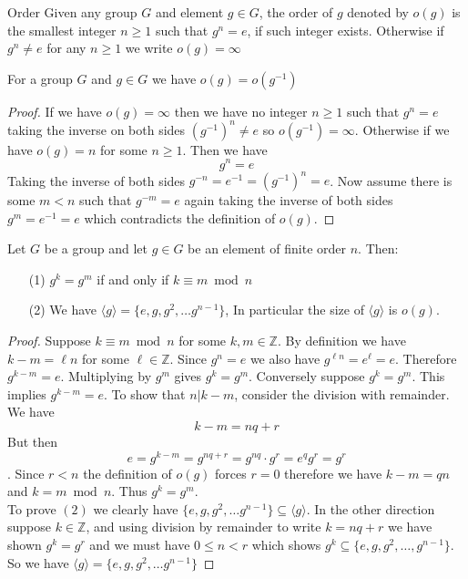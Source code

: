 \documentclass[16pt,a4paper]{article}
\theoremstyle{definition}
\newcommand{\ang}[1]{\langle #1 \rangle}
\begin{document}
\begin{defn}{Order}{}
Given any group $G$ and element $g\in G$, the order of $g$ denoted by $o(g)$ is the smallest integer $n\geq 1$ such that $g^n = e$, if such integer exists. Otherwise if $g^n\neq e$ for any $n\geq 1$ we write $o(g) = \infty$ 
\end{defn}

\begin{prop}{}{}
For a group $G$ and $g\in G$ we have $o(g) = o(g^{-1})$
\end{prop}

\begin{proof}
If we have $o(g) = \infty$ then we have no integer $n\geq 1$ such that $g^n = e$ taking the inverse on both sides $(g^{-1})^n\neq e$ so $o(g^{-1}) = \infty$. Otherwise if we have $o(g) = n$ for some $n\geq 1$. Then we have 
\[g^n = e\]
Taking the inverse of both sides $g^{-n} = e^{-1} = (g^{-1})^n = e$. Now assume there is some $m<n$ such that $g^{-m} = e$ again taking the inverse of both sides $g^m = e^{-1} = e$ which contradicts the definition of $o(g)$.  
\end{proof}



\begin{thm}{}{}\label{thm5}
Let $G$ be a group and let $g\in G$ be an element of finite order $n$. Then:

\begin{itemize}
\item[(1)] $g^k = g^m$ if and only if $k\equiv m \bmod n$
\item[(2)] We have $\ang{g} = \{e,g,g^2, \ldots g^{n-1}\}$, In particular the size of $\ang{g}$ is $o(g)$. 
\end{itemize}
\end{thm}
\begin{proof}
Suppose $k \equiv m\bmod n$ for some $k,m\in \mathbb{Z}$. By definition we have $k-m = \ell n$ for some $\ell \in \mathbb{Z}$. Since $g^n = e$ we also have $g^{\ell n} = e^\ell = e$. Therefore $g^{k-m} = e$. Multiplying by $g^m$ gives $g^k = g^m$.  Conversely suppose $g^k = g^m$. This implies $g^{k-m} = e$. To show that $n|k-m$, consider the division with remainder. We have
\[k-m = nq + r\] 
But then $$e=g^{k-m}=g^{nq+r} = g^{nq}\cdot g^r = e^qg^r = g^r$$. Since $r<n$ the definition of $o(g)$ forces $r=0$ therefore we have $k-m = qn$ and $k=m\bmod n$. Thus $g^k = g^m$. 
\\

To prove $(2)$ we clearly have $\{e, g, g^2, \ldots g^{n-1}\} \subseteq \ang{g}$. In the other direction suppose $k\in \mathbb{Z}$, and using division by remainder to write $k=nq+r$ we have shown $g^k = g^r$ and we must have $0\leq n < r$ which shows $g^k \subseteq \{e,g,g^2, \ldots, g^{n-1}\}$. So we have $\ang{g} = \{e,g,g^2, \ldots g^{n-1}\}$
\end{proof}
\end{document}

